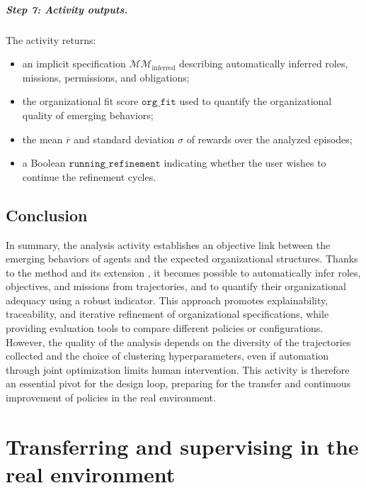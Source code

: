 \begin{itemize}
\paragraph{Step 7: Activity outputs.}
The activity returns:
\begin{itemize}
  \item an implicit specification $\mathcal{MM}_{\text{inferred}}$ describing automatically inferred roles, missions, permissions, and obligations;
  \item the organizational fit score $\texttt{org\_fit}$ used to quantify the organizational quality of emerging behaviors;
  \item the mean $\overline{r}$ and standard deviation $\sigma$ of rewards over the analyzed episodes;
  \item a Boolean $\texttt{running\_refinement}$ indicating whether the user wishes to continue the refinement cycles.
\end{itemize}


\section {Conclusion}

In summary, the analysis activity establishes an objective link between the emerging behaviors of agents and the expected organizational structures. Thanks to the  method and its extension , it becomes possible to automatically infer roles, objectives, and missions from trajectories, and to quantify their organizational adequacy using a robust indicator. This approach promotes explainability, traceability, and iterative refinement of organizational specifications, while providing evaluation tools to compare different policies or configurations. However, the quality of the analysis depends on the diversity of the trajectories collected and the choice of clustering hyperparameters, even if automation through joint optimization limits human intervention. This activity is therefore an essential pivot for the  design loop, preparing for the transfer and continuous improvement of policies in the real environment.


\clearpage
\thispagestyle{empty}
\null
\newpage

\chapter{Transferring and supervising in the real environment}
\label{chap:transferring}


\end{itemize}
